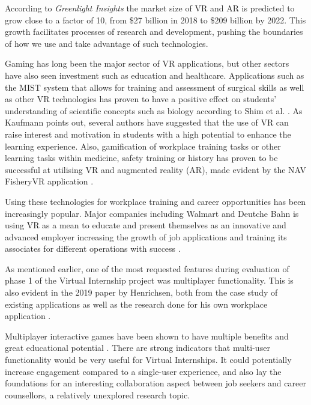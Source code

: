 According to \textit{Greenlight Insights} \cite{forcastVR} the market size of VR and AR is predicted to grow close to a factor of 10, from \$27 billion in 2018 to \$209 billion by 2022. This growth facilitates processes of research and development, pushing the boundaries of how we use and take advantage of such technologies.

Gaming has long been the major sector of VR applications, but other sectors have also seen investment such as education and healthcare. Applications such as the MIST system \cite{mccloy2001virtual} that allows for training and assessment of surgical skills as well as other VR technologies has proven to have a positive effect on students' understanding of scientific concepts such as biology according to Shim et al. \cite{shim2003application}. As Kaufmann \cite{kaufmann2003collaborative} points out, several authors have suggested that the use of VR can raise interest and motivation in students with a high potential to enhance the learning experience.
Also, gamification of workplace training tasks or other learning tasks within medicine, safety training or history has proven to be successful at utilising VR and augmented reality (AR), made evident by the NAV FisheryVR application \cite{fishfarmNAV}. 

Using these technologies for workplace training and career opportunities has been increasingly popular. Major companies including  Walmart and Deutche Bahn is using VR as a mean to educate and present themselves as an innovative and advanced employer increasing the growth of job applications and training its associates for different operations with success \cite{vasilenko2019virtual}.    

As mentioned earlier, one of the most requested features during evaluation of phase 1 of the Virtual Internship project was multiplayer functionality. This is also evident in the 2019 paper by Henrichsen, both from the case study of existing applications as well as the research done for his own workplace application \cite{henrichsen2019engaging}.

Multiplayer interactive games have been shown to have multiple benefits and great educational potential \cite{ducheneaut2006alone} \cite{nardi2006strangers} \cite{steiner2006play}. There are strong indicators that multi-user functionality would be very useful for Virtual Internships. It could potentially increase engagement compared to a single-user experience, and also lay the foundations for an interesting collaboration aspect between job seekers and career counsellors, a relatively unexplored research topic.   



